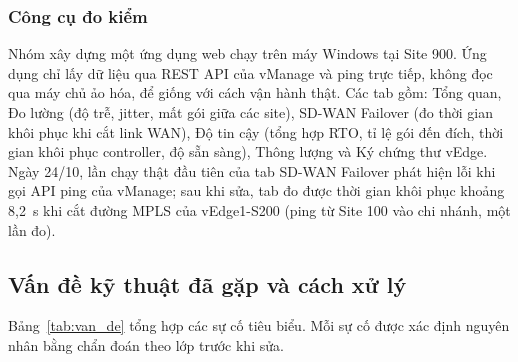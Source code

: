 \subsubsection{Công cụ đo kiểm}

Nhóm xây dựng một ứng dụng web chạy trên máy Windows tại Site 900. Ứng dụng chỉ lấy dữ liệu qua REST API của vManage và ping trực tiếp, không đọc qua máy chủ ảo hóa, để giống với cách vận hành thật. Các tab gồm: Tổng quan, Đo lường (độ trễ, jitter, mất gói giữa các site), SD-WAN Failover (đo thời gian khôi phục khi cắt link WAN), Độ tin cậy (tổng hợp RTO, tỉ lệ gói đến đích, thời gian khôi phục controller, độ sẵn sàng), Thông lượng và Ký chứng thư vEdge. Ngày 24/10, lần chạy thật đầu tiên của tab SD-WAN Failover phát hiện lỗi khi gọi API ping của vManage; sau khi sửa, tab đo được thời gian khôi phục khoảng 8,2~s khi cắt đường MPLS của vEdge1-S200 (ping từ Site 100 vào chi nhánh, một lần đo).

\subsection{Vấn đề kỹ thuật đã gặp và cách xử lý}

Bảng~\ref{tab:van_de} tổng hợp các sự cố tiêu biểu. Mỗi sự cố được xác định nguyên nhân bằng chẩn đoán theo lớp trước khi sửa.

